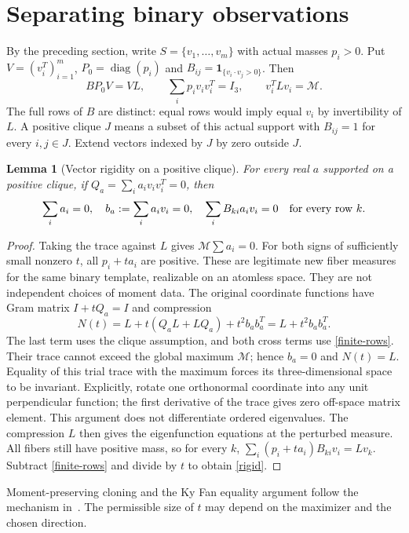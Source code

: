 \documentclass[11pt]{article}
\newtheorem{lemma}[theorem]{Lemma}
\theoremstyle{remark}\newtheorem{remark}[theorem]{Remark}
\DeclareMathOperator{\diag}{diag}
\numberwithin{equation}{section}
\begin{document}
\section{Separating binary observations}\label{sec-separation}
By the preceding section, write $S=\{v_1,\ldots,v_m\}$ with actual masses
$p_i>0$. Put $V=(v_i^T)_{i=1}^m$, $P_0=\diag(p_i)$ and
$B_{ij}=\mathbf1_{\{v_i\cdot v_j>0\}}$. Then
\begin{equation}\label{finite-rows}
 BP_0V=VL,\qquad \sum_i p_iv_iv_i^T=I_3,\qquad
 v_i^TLv_i=\mathcal M.
\end{equation}
The full rows of $B$ are distinct: equal rows would imply equal $v_i$
by invertibility of $L$. A positive clique $J$ means a subset of this actual support with $B_{ij}=1$
for every $i,j\in J$. Extend vectors indexed by $J$ by zero outside $J$.
\begin{lemma}[Vector rigidity on a positive clique]
For every real $a$ supported on a positive clique, if
$Q_a=\sum_i a_i v_iv_i^T=0$, then
\begin{equation}
 \sum_i a_i=0,\quad b_a:=\sum_i a_iv_i=0,\quad
 \sum_i B_{ki}a_iv_i=0\quad\hbox{for every row }k. \label{rigid}
\end{equation}
\end{lemma}
\begin{proof}
Taking the trace against $L$ gives $\mathcal M\sum a_i=0$.
For both signs of sufficiently small nonzero $t$, all $p_i+ta_i$ are positive.
These are legitimate new fiber measures for the same binary template, realizable
on an atomless space. They are not independent choices of moment data.
The original coordinate functions have Gram matrix $I+tQ_a=I$ and compression
\[
 N(t)=L+t(Q_aL+LQ_a)+t^2b_ab_a^T=L+t^2b_ab_a^T.
\]
The last term uses the clique assumption, and both cross terms use \eqref{finite-rows}.
Their trace cannot exceed the global maximum $\mathcal M$; hence $b_a=0$ and $N(t)=L$.
Equality of this trial trace with the maximum forces its three-dimensional
space to be invariant. Explicitly, rotate one orthonormal coordinate into any
unit perpendicular function; the first derivative of the trace gives zero
off-space matrix element. This argument does not differentiate ordered eigenvalues.
The compression $L$ then gives the eigenfunction equations at the perturbed measure.
All fibers still have positive mass, so for every $k$,
$\sum_i(p_i+ta_i)B_{ki}v_i=Lv_k$.
Subtract \eqref{finite-rows} and divide by $t$ to obtain \eqref{rigid}.
\end{proof}
Moment-preserving cloning and the Ky Fan equality argument follow the
mechanism in~\cite[Claims 2.2--2.5]{KMMP}. The permissible size of $t$
may depend on the maximizer and the chosen direction.
\end{document}
